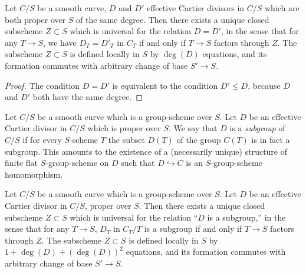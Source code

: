 \begin{corollary}\label{cor:1.3.5}
Let $C/S$ be a smooth curve, $D$ and $D'$ effective Cartier divisors in $C/S$ which are both proper over $S$ of the same degree. Then there exists a unique closed subscheme $Z \subset S$ which is universal for the relation $D = D'$, in the sense that for any $T \to S$, we have $D_T = D'_T$ in $C_T$ if and only if $T \to S$ factors through $Z$. The subscheme $Z \subset S$ is defined locally in $S$ by $\deg(D)$ equations, and its formation commutes with arbitrary change of base $S' \to S$.
\end{corollary}

\begin{proof}
The condition $D = D'$ is equivalent to the condition $D' \le D$, because $D$ and $D'$ both have the same degree.
\end{proof}

\kmitem\label{item:1.3.6}
Let $C/S$ be a smooth curve which is a group-scheme over $S$. Let $D$ be an effective Cartier divisor in $C/S$ which is proper over $S$. We say that $D$ is a \emph{subgroup} of $C/S$ if for every $S$-scheme $T$ the subset $D(T)$ of the group $C(T)$ is in fact a subgroup. This amounts to the existence of a (necessarily unique) structure of finite flat $S$-group-scheme on $D$ such that $D \hookrightarrow C$ is an $S$-group-scheme homomorphism.

\begin{corollary}\label{cor:1.3.7}
Let $C/S$ be a smooth curve which is a group-scheme over $S$. Let $D$ be an effective Cartier divisor in $C/S$, proper over $S$. Then there exists a unique closed subscheme $Z \subset S$ which is universal for the relation ``$D$ is a subgroup,'' in the sense that for any $T \to S$, $D_T$ in $C_T/T$ is a subgroup if and only if $T \to S$ factors through $Z$. The subscheme $Z \subset S$ is defined locally in $S$ by $1 + \deg(D) + (\deg(D))^2$ equations, and its formation commutes with arbitrary change of base $S' \to S$.
\end{corollary}

